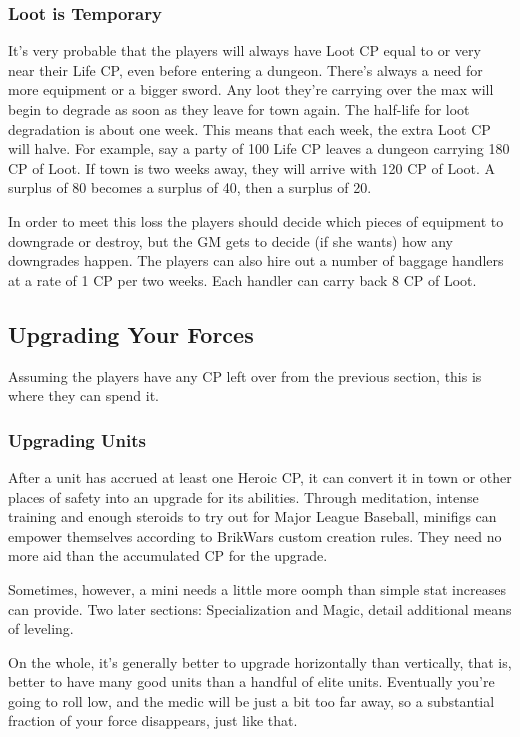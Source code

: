 \documentclass[12pt,a4paper,twocolumn]{article}
\begin{document}
\subsubsection{Loot is Temporary}

It's very probable that the players will always have Loot CP equal to or very near their Life CP, even before entering a dungeon.  There's always a need for more equipment or a bigger sword.  Any loot they're carrying over the max will begin to degrade as soon as they leave for town again.  The half-life for loot degradation is about one week.  This means that each week, the extra Loot CP will halve.  For example, say a party of 100 Life CP leaves a dungeon carrying 180 CP of Loot.  If town is two weeks away, they will arrive with 120 CP of Loot.  A surplus of 80 becomes a surplus of 40, then a surplus of 20.  

In order to meet this loss the players should decide which pieces of equipment to downgrade or destroy, but the GM gets to decide (if she wants) how any downgrades happen.  The players can also hire out a number of baggage handlers at a rate of 1 CP per two weeks.  Each handler can carry back 8 CP of Loot.

\subsection{Upgrading Your Forces}

Assuming the players have any CP left over from the previous section, this is where they can spend it.

\subsubsection{Upgrading Units}

After a unit has accrued at least one Heroic CP, it can convert it in town or other places of safety into an upgrade for its abilities.  Through meditation, intense training and enough steroids to try out for Major League Baseball, minifigs can empower themselves according to BrikWars custom creation rules.  They need no more aid than the accumulated CP for the upgrade. 

Sometimes, however, a mini needs a little more oomph than simple stat increases can provide.  Two later sections: Specialization and Magic, detail additional means of leveling.

On the whole, it's generally better to upgrade horizontally than vertically, that is, better to have many good units than a handful of elite units.  Eventually you're going to roll low, and the medic will be just a bit too far away, so a substantial fraction of your force disappears, just like that.
\end{document}

